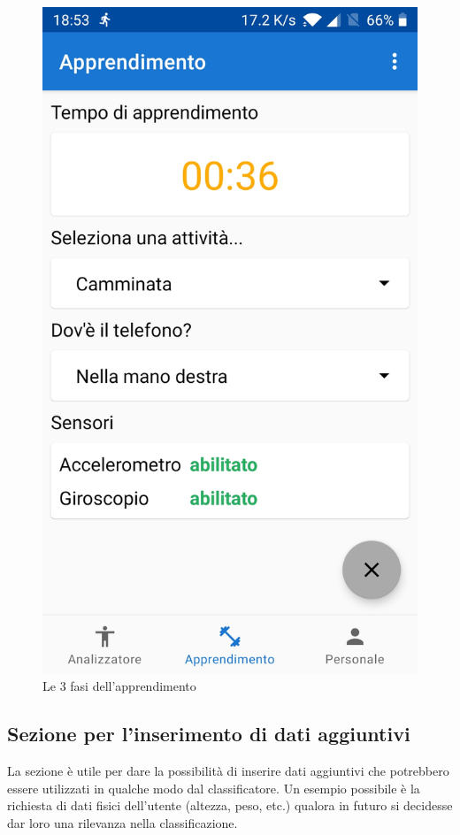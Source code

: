 \begin{figure}[H]
    \includegraphics[scale = 0.1019]{assets/images/screenshots/2c_Learning.jpg}
    \caption{Le 3 fasi dell'apprendimento}
    \label{fig:screenshots_learning}
\end{figure}


\subsection{Sezione per l'inserimento di dati aggiuntivi}
La sezione è utile per dare la possibilità di inserire dati aggiuntivi che potrebbero essere utilizzati in qualche modo
dal classificatore. Un esempio possibile è la richiesta di dati fisici dell'utente (altezza, peso, etc.) qualora in futuro
si decidesse dar loro una rilevanza nella classificazione.


